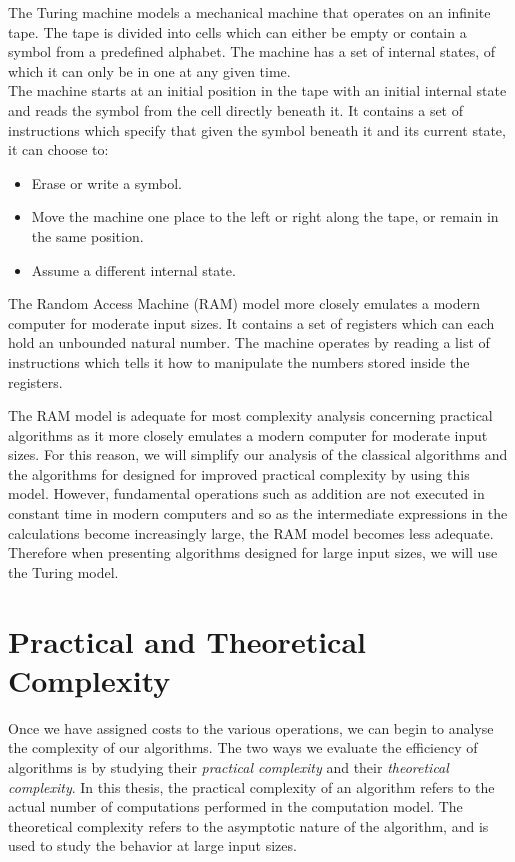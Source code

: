 The Turing machine models a mechanical machine that operates on an infinite tape. The tape is divided into cells which can either be empty or contain a symbol from a predefined alphabet. The machine has a set of internal states, of which it can only be in one at any given time.\\
The machine starts at an initial position in the tape with an initial internal state and reads the symbol from the cell directly beneath it. It contains a set of instructions which specify that given the symbol beneath it and its current state, it can choose to:
\begin{itemize}
    \item Erase or write a symbol.
    \item Move the machine one place to the left or right along the tape, or remain in the same position.
    \item Assume a different internal state.
\end{itemize}

The Random Access Machine (RAM) model more closely emulates a modern computer for moderate input sizes. It contains a set of registers which can each hold an unbounded natural number. The machine operates by reading a list of instructions which tells it how to manipulate the numbers stored inside the registers.

The RAM model is adequate for most complexity analysis concerning practical algorithms as it more closely emulates a modern computer for moderate input sizes. For this reason, we will simplify our analysis of the classical algorithms and the algorithms for designed for improved practical complexity by using this model. However, fundamental operations such as addition are not executed in constant time in modern computers and so as the intermediate expressions in the calculations become increasingly large, the RAM model becomes less adequate. Therefore when presenting algorithms designed for large input sizes, we will use the Turing model.

\section{Practical and Theoretical Complexity}%
\label{sec:Practical and Theoretical Complexity}

Once we have assigned costs to the various operations, we can begin to analyse the complexity of our algorithms. The two ways we evaluate the efficiency of algorithms is by studying their \emph{practical complexity} and their \emph{theoretical complexity}. In this thesis, the practical complexity of an algorithm refers to the actual number of computations performed in the computation model. The theoretical complexity refers to the asymptotic nature of the algorithm, and is used to study the behavior at large input sizes.

